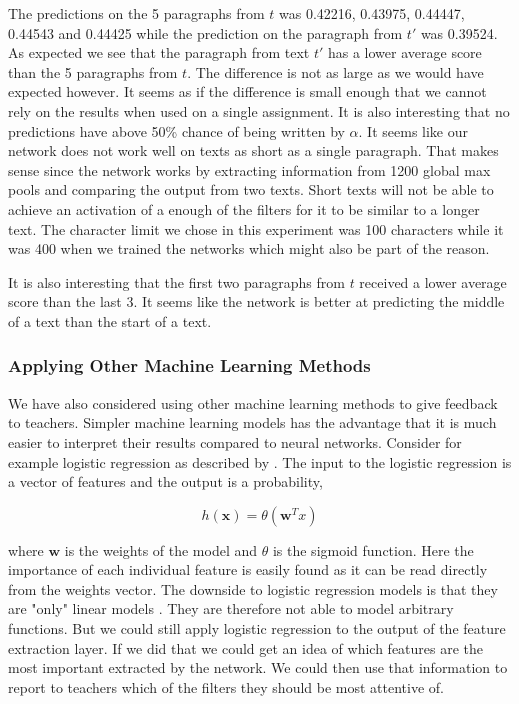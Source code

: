 The predictions on the 5 paragraphs from $t$ was 0.42216, 0.43975, 0.44447,
0.44543 and 0.44425 while the prediction on the paragraph from $t'$ was 0.39524.
As expected we see that the paragraph from text $t'$ has a lower average score
than the 5 paragraphs from $t$. The difference is not as large as we would
have expected however. It seems as if the difference is small enough that
we cannot rely on the results when used on a single assignment. It is also
interesting that no predictions have above 50\% chance of being written by
$\alpha$. It seems like our network does not work well on texts as short as
a single paragraph. That makes sense since the network works by extracting
information from 1200 global max pools and comparing the output from two texts.
Short texts will not be able to achieve an activation of a enough of the filters
for it to be similar to a longer text. The character limit we chose in this
experiment was 100 characters while it was 400 when we trained the networks
which might also be part of the reason.

It is also interesting that the first two paragraphs from $t$ received a lower
average score than the last 3. It seems like the network is better at predicting
the middle of a text than the start of a text.


\subsubsection{Applying Other Machine Learning Methods}

We have also considered using other machine learning methods to give feedback
to teachers. Simpler machine learning models has the advantage that it is much
easier to interpret their results compared to neural networks. Consider for
example logistic regression as described by \citet{Abu-Mostafa:2012:LD:2207825}.
The input to the logistic regression is a vector of features and the output is a
probability,

\begin{equation}
    h(\mathbf{x}) = \theta(\mathbf{w}^Tx)
\end{equation}

where $\mathbf{w}$ is the weights of the model and $\theta$ is the sigmoid
function. Here the importance of each individual feature is easily
found as it can be read directly from the weights vector. The downside
to logistic regression models is that they are "only" linear models
\citet{Abu-Mostafa:2012:LD:2207825}. They are therefore not able to model
arbitrary functions. But we could still apply logistic regression to the output
of the feature extraction layer. If we did that we could get an idea of which
features are the most important extracted by the network. We could then use
that information to report to teachers which of the filters they should be most
attentive of.

